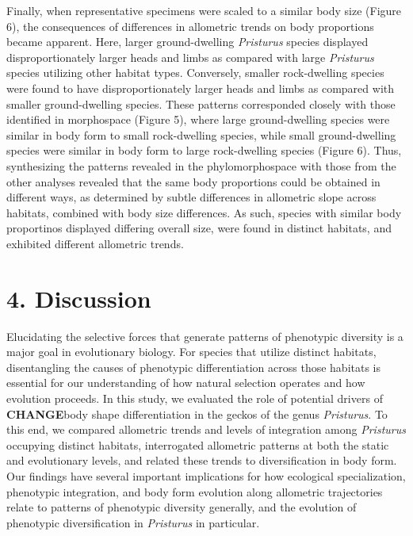 \documentclass[
  11pt,
]{article}
\begin{document}
Finally, when representative specimens were scaled to a similar body
size (Figure 6), the consequences of differences in allometric trends on
body proportions became apparent. Here, larger ground-dwelling
\emph{Pristurus} species displayed disproportionately larger heads and
limbs as compared with large \emph{Pristurus} species utilizing other
habitat types. Conversely, smaller rock-dwelling species were found to
have disproportionately larger heads and limbs as compared with smaller
ground-dwelling species. These patterns corresponded closely with those
identified in morphospace (Figure 5), where large ground-dwelling
species were similar in body form to small rock-dwelling species, while
small ground-dwelling species were similar in body form to large
rock-dwelling species (Figure 6). Thus, synthesizing the patterns
revealed in the phylomorphospace with those from the other analyses
revealed that the same body proportions could be obtained in different
ways, as determined by subtle differences in allometric slope across
habitats, combined with body size differences. As such, species with
similar body proportinos displayed differing overall size, were found in
distinct habitats, and exhibited different allometric trends.
\hfill\break

\hypertarget{discussion}{%
\section{4. Discussion}\label{discussion}}

Elucidating the selective forces that generate patterns of phenotypic
diversity is a major goal in evolutionary biology. For species that
utilize distinct habitats, disentangling the causes of phenotypic
differentiation across those habitats is essential for our understanding
of how natural selection operates and how evolution proceeds. In this
study, we evaluated the role of potential drivers of \textbf{CHANGE}body
shape differentiation in the geckos of the genus \emph{Pristurus}. To
this end, we compared allometric trends and levels of integration among
\emph{Pristurus} occupying distinct habitats, interrogated allometric
patterns at both the static and evolutionary levels, and related these
trends to diversification in body form. Our findings have several
important implications for how ecological specialization, phenotypic
integration, and body form evolution along allometric trajectories
relate to patterns of phenotypic diversity generally, and the evolution
of phenotypic diversification in \emph{Pristurus} in particular.
\hfill\break
\end{document}
